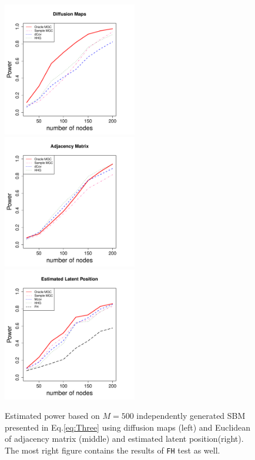 \documentclass[12pt]{article}
\theoremstyle{definition}
\begin{document}
\begin{figure}[H]
	\centering
	\label{fig:Three}
		\includegraphics[width=2.3in]{../Figure/ThreeSBM.pdf}
		\includegraphics[width=2.3in]{../Figure/EThreeSBM.pdf}
		\includegraphics[width =2.3in]{../Figure/fThreeSBM.pdf}
		\caption{Estimated power based on $M = 500$ independently generated SBM presented in Eq.\ref{eq:Three} using diffusion maps (left) and Euclidean of adjacency matrix (middle)  and estimated latent position(right). The most right figure contains the results of \texttt{FH} test as well.}
\end{figure}	
\end{document}
